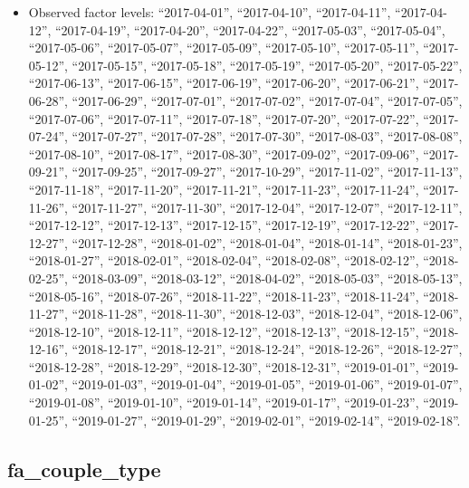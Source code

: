 \documentclass[
  letterpaper,
  DIV=11,
  numbers=noendperiod]{scrartcl}
\providecommand{\tightlist}{%
  \setlength{\itemsep}{0pt}\setlength{\parskip}{0pt}}
\begin{document}
\emini

\begin{itemize}
\tightlist
\item
  Observed factor levels: ``2017-04-01'', ``2017-04-10'',
  ``2017-04-11'', ``2017-04-12'', ``2017-04-19'', ``2017-04-20'',
  ``2017-04-22'', ``2017-05-03'', ``2017-05-04'', ``2017-05-06'',
  ``2017-05-07'', ``2017-05-09'', ``2017-05-10'', ``2017-05-11'',
  ``2017-05-12'', ``2017-05-15'', ``2017-05-18'', ``2017-05-19'',
  ``2017-05-20'', ``2017-05-22'', ``2017-06-13'', ``2017-06-15'',
  ``2017-06-19'', ``2017-06-20'', ``2017-06-21'', ``2017-06-28'',
  ``2017-06-29'', ``2017-07-01'', ``2017-07-02'', ``2017-07-04'',
  ``2017-07-05'', ``2017-07-06'', ``2017-07-11'', ``2017-07-18'',
  ``2017-07-20'', ``2017-07-22'', ``2017-07-24'', ``2017-07-27'',
  ``2017-07-28'', ``2017-07-30'', ``2017-08-03'', ``2017-08-08'',
  ``2017-08-10'', ``2017-08-17'', ``2017-08-30'', ``2017-09-02'',
  ``2017-09-06'', ``2017-09-21'', ``2017-09-25'', ``2017-09-27'',
  ``2017-10-29'', ``2017-11-02'', ``2017-11-13'', ``2017-11-18'',
  ``2017-11-20'', ``2017-11-21'', ``2017-11-23'', ``2017-11-24'',
  ``2017-11-26'', ``2017-11-27'', ``2017-11-30'', ``2017-12-04'',
  ``2017-12-07'', ``2017-12-11'', ``2017-12-12'', ``2017-12-13'',
  ``2017-12-15'', ``2017-12-19'', ``2017-12-22'', ``2017-12-27'',
  ``2017-12-28'', ``2018-01-02'', ``2018-01-04'', ``2018-01-14'',
  ``2018-01-23'', ``2018-01-27'', ``2018-02-01'', ``2018-02-04'',
  ``2018-02-08'', ``2018-02-12'', ``2018-02-25'', ``2018-03-09'',
  ``2018-03-12'', ``2018-04-02'', ``2018-05-03'', ``2018-05-13'',
  ``2018-05-16'', ``2018-07-26'', ``2018-11-22'', ``2018-11-23'',
  ``2018-11-24'', ``2018-11-27'', ``2018-11-28'', ``2018-11-30'',
  ``2018-12-03'', ``2018-12-04'', ``2018-12-06'', ``2018-12-10'',
  ``2018-12-11'', ``2018-12-12'', ``2018-12-13'', ``2018-12-15'',
  ``2018-12-16'', ``2018-12-17'', ``2018-12-21'', ``2018-12-24'',
  ``2018-12-26'', ``2018-12-27'', ``2018-12-28'', ``2018-12-29'',
  ``2018-12-30'', ``2018-12-31'', ``2019-01-01'', ``2019-01-02'',
  ``2019-01-03'', ``2019-01-04'', ``2019-01-05'', ``2019-01-06'',
  ``2019-01-07'', ``2019-01-08'', ``2019-01-10'', ``2019-01-14'',
  ``2019-01-17'', ``2019-01-23'', ``2019-01-25'', ``2019-01-27'',
  ``2019-01-29'', ``2019-02-01'', ``2019-02-14'', ``2019-02-18''.
\end{itemize}

\fullline

\subsection{fa\_couple\_type}\label{fa_couple_type}
\end{document}
